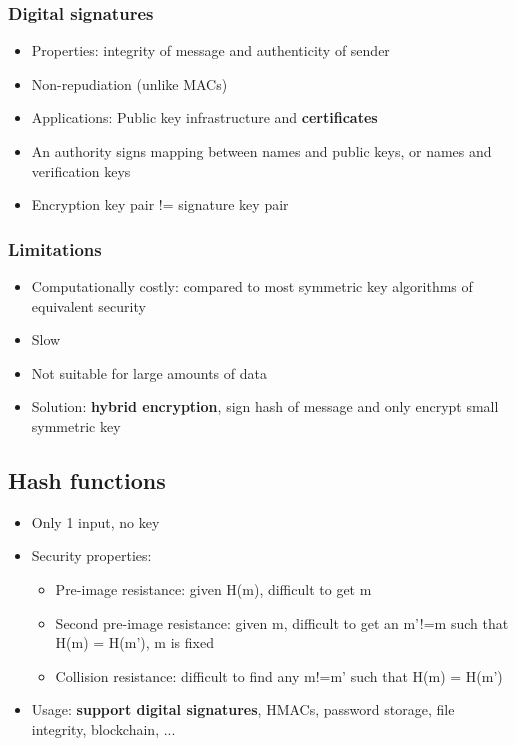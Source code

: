 \documentclass{article}
\newenvironment{myitemize}
{ \begin{itemize}
    \setlength{\itemsep}{005pt}
    \setlength{\parskip}{0pt}
    \setlength{\parsep}{0pt}     }
{ \end{itemize}                  }
\begin{document}
\begin{multicols}{2}
\subsubsection{Digital signatures}

\begin{myitemize}
    \item Properties: integrity of message and authenticity of sender
    \item Non-repudiation (unlike MACs)
    \item Applications: Public key infrastructure and \textbf{certificates}
    \item An authority signs mapping between names and public keys, or names and verification keys
    \item Encryption key pair != signature key pair
\end{myitemize}

\subsubsection{Limitations}

\begin{myitemize}
    \item Computationally costly: compared to most symmetric key algorithms of equivalent security
    \item Slow
    \item Not suitable for large amounts of data
    \item Solution: \textbf{hybrid encryption}, sign hash of message and only encrypt small symmetric key
\end{myitemize}


\subsection{Hash functions}


\begin{myitemize}
    \item Only 1 input, no key
    \item Security properties:
    \begin{myitemize}
        \item Pre-image resistance: given H(m), difficult to get m
        \item Second pre-image resistance: given m, difficult to get an m'!=m such that H(m) = H(m'), m is fixed
        \item Collision resistance: difficult to find any m!=m' such that H(m) = H(m')
    \end{myitemize}
    \item Usage: \textbf{support digital signatures}, HMACs, password storage, file integrity, blockchain, ...
\end{myitemize}


\end{multicols}
\end{document}
